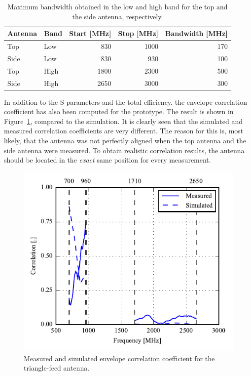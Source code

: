    \begin{table}
      \centering
      \begin{tabular}{|l|l|r|r|r|}
        \hline
        Antenna & Band & Start [MHz] & Stop [MHz] & Bandwidth [MHz] \\
        \hline
        Top     & Low  & 830        & 1000       & 170 \\
        Side    & Low  & 830         & 930        & 100 \\
        \hline
        Top     & High & 1800        & 2300       & 500 \\
        Side    & High & 2650        & 3000       & 300 \\
        \hline
      \end{tabular}
      \caption{Maximum bandwidth obtained in the low and high band for the top and the side antenna, respectively.}
      \label{tab:bw_sol2_proto}
    \end{table}

In addition to the S-parameters and the total efficiency, the envelope correlation coefficient has also been computed for the prototype. The result is shown in Figure~\ref{fig:triang_proto_ecc}, compared to the simulation. It is clearly seen that the simulated and measured correlation coefficients are very different. The reason for this is, most likely, that the antenna was not perfectly aligned when the top antenna and the side antenna were measured. To obtain realistic correlation results, the antenna should be located in the \emph{exact} same position for every measurement.

\begin{figure}[htbp]
    \centering
    \includegraphics{img/tech_sol/trianglefeed/mockup/best_correlation.pdf}
    \caption{Measured and simulated envelope correlation coefficient for the triangle-feed antenna.}
    \label{fig:triang_proto_ecc}
\end{figure}

